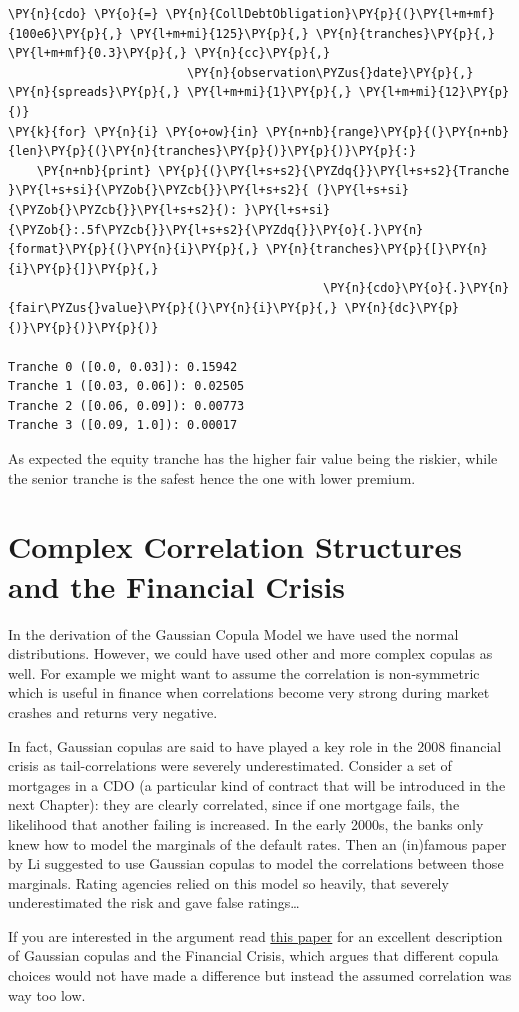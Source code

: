 \begin{tcolorbox}[breakable, size=fbox, boxrule=1pt, pad at break*=1mm,colback=cellbackground, colframe=cellborder]
\begin{Verbatim}[commandchars=\\\{\}]
\PY{n}{cdo} \PY{o}{=} \PY{n}{CollDebtObligation}\PY{p}{(}\PY{l+m+mf}{100e6}\PY{p}{,} \PY{l+m+mi}{125}\PY{p}{,} \PY{n}{tranches}\PY{p}{,} \PY{l+m+mf}{0.3}\PY{p}{,} \PY{n}{cc}\PY{p}{,}
                         \PY{n}{observation\PYZus{}date}\PY{p}{,} \PY{n}{spreads}\PY{p}{,} \PY{l+m+mi}{1}\PY{p}{,} \PY{l+m+mi}{12}\PY{p}{)}
\PY{k}{for} \PY{n}{i} \PY{o+ow}{in} \PY{n+nb}{range}\PY{p}{(}\PY{n+nb}{len}\PY{p}{(}\PY{n}{tranches}\PY{p}{)}\PY{p}{)}\PY{p}{:}
    \PY{n+nb}{print} \PY{p}{(}\PY{l+s+s2}{\PYZdq{}}\PY{l+s+s2}{Tranche }\PY{l+s+si}{\PYZob{}\PYZcb{}}\PY{l+s+s2}{ (}\PY{l+s+si}{\PYZob{}\PYZcb{}}\PY{l+s+s2}{): }\PY{l+s+si}{\PYZob{}:.5f\PYZcb{}}\PY{l+s+s2}{\PYZdq{}}\PY{o}{.}\PY{n}{format}\PY{p}{(}\PY{n}{i}\PY{p}{,} \PY{n}{tranches}\PY{p}{[}\PY{n}{i}\PY{p}{]}\PY{p}{,} 
                                            \PY{n}{cdo}\PY{o}{.}\PY{n}{fair\PYZus{}value}\PY{p}{(}\PY{n}{i}\PY{p}{,} \PY{n}{dc}\PY{p}{)}\PY{p}{)}\PY{p}{)}

Tranche 0 ([0.0, 0.03]): 0.15942
Tranche 1 ([0.03, 0.06]): 0.02505
Tranche 2 ([0.06, 0.09]): 0.00773
Tranche 3 ([0.09, 1.0]): 0.00017
\end{Verbatim}
\end{tcolorbox}

As expected the equity tranche has the higher fair value being the riskier, while the senior tranche is the safest hence the one with lower premium.

\section{Complex Correlation Structures and the Financial
	Crisis}\label{complex-correlation-structures-and-the-financial-crisis}

In the derivation of the Gaussian Copula Model we have used the normal distributions. However, we could have used other and more complex
copulas as well. For example we might want to assume the correlation is
non-symmetric which is useful in finance when correlations become
very strong during market crashes and returns very negative.

In fact, Gaussian copulas are said to have played a key role in the 2008
financial crisis as tail-correlations were severely underestimated.
Consider a set of mortgages in a CDO (a particular kind of contract that will be introduced in the next Chapter): they are clearly correlated, since if one mortgage fails,
the likelihood that another failing is increased. In the early 2000s,
the banks only knew how to model the marginals of the default rates. Then an
(in)famous paper by Li suggested to use Gaussian copulas to model the
correlations between those marginals. Rating agencies relied on this model so heavily, that severely underestimated the risk and gave false ratings\ldots

If you are interested in the argument read
\href{http://samueldwatts.com/wp-content/uploads/2016/08/Watts-Gaussian-Copula_Financial_Crisis.pdf}{this paper}
for an excellent description of Gaussian copulas and the Financial
Crisis, which argues that different copula choices would not have made a
difference but instead the assumed correlation was way too low.
